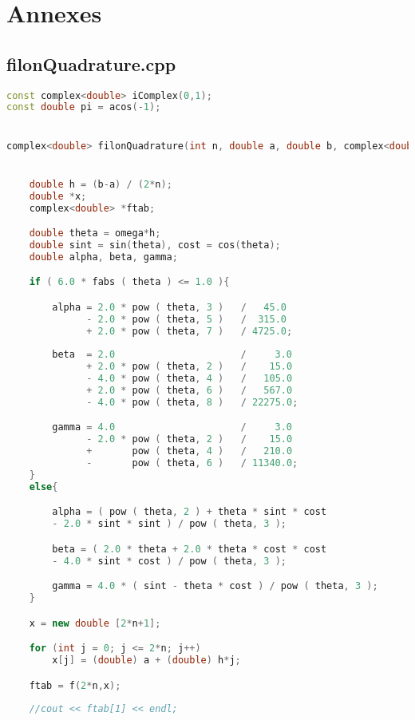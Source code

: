 
\chapter{Annexes}

\section{filonQuadrature.cpp}

\begin{lstlisting}[language=C++]
const complex<double> iComplex(0,1);
const double pi = acos(-1);


complex<double> filonQuadrature(int n, double a, double b, complex<double> *f(int n , double x[]), double omega){


    double h = (b-a) / (2*n);
    double *x;
    complex<double> *ftab;

    double theta = omega*h;
    double sint = sin(theta), cost = cos(theta);
    double alpha, beta, gamma;

    if ( 6.0 * fabs ( theta ) <= 1.0 ){

        alpha = 2.0 * pow ( theta, 3 )   /   45.0 
              - 2.0 * pow ( theta, 5 )   /  315.0 
              + 2.0 * pow ( theta, 7 )   / 4725.0;
    
        beta  = 2.0                      /     3.0 
              + 2.0 * pow ( theta, 2 )   /    15.0 
              - 4.0 * pow ( theta, 4 )   /   105.0 
              + 2.0 * pow ( theta, 6 )   /   567.0 
              - 4.0 * pow ( theta, 8 )   / 22275.0;

        gamma = 4.0                      /     3.0 
              - 2.0 * pow ( theta, 2 )   /    15.0 
              +       pow ( theta, 4 )   /   210.0 
              -       pow ( theta, 6 )   / 11340.0;
    }
    else{

        alpha = ( pow ( theta, 2 ) + theta * sint * cost 
        - 2.0 * sint * sint ) / pow ( theta, 3 );

        beta = ( 2.0 * theta + 2.0 * theta * cost * cost
        - 4.0 * sint * cost ) / pow ( theta, 3 );

        gamma = 4.0 * ( sint - theta * cost ) / pow ( theta, 3 );
    }

    x = new double [2*n+1];

    for (int j = 0; j <= 2*n; j++)
        x[j] = (double) a + (double) h*j; 

    ftab = f(2*n,x); 
    
    //cout << ftab[1] << endl;


\end{lstlisting}
